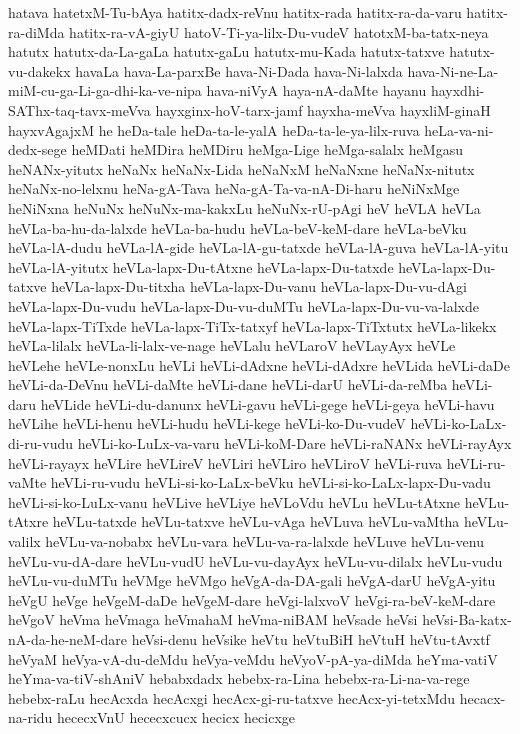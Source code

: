 {hatava
hatetxM-Tu-bAya
hatitx-dadx-reVnu
hatitx-rada
hatitx-ra-da-varu
hatitx-ra-diMda
hatitx-ra-vA-giyU
hatoV-Ti-ya-lilx-Du-vudeV
hatotxM-ba-tatx-neya
hatutx
hatutx-da-La-gaLa
hatutx-gaLu
hatutx-mu-Kada
hatutx-tatxve
hatutx-vu-dakekx
havaLa
hava-La-parxBe
hava-Ni-Dada
hava-Ni-lalxda
hava-Ni-ne-La-miM-cu-ga-Li-ga-dhi-ka-ve-nipa
hava-niVyA
haya-nA-daMte
hayanu
hayxdhi-SAThx-taq-tavx-meVva
hayxginx-hoV-tarx-jamf
hayxha-meVva
hayxliM-ginaH
hayxvAgajxM
he
heDa-tale
heDa-ta-le-yalA
heDa-ta-le-ya-lilx-ruva
heLa-va-ni-dedx-sege
heMDati
heMDira
heMDiru
heMga-Lige
heMga-salalx
heMgasu
heNANx-yitutx
heNaNx
heNaNx-Lida
heNaNxM
heNaNxne
heNaNx-nitutx
heNaNx-no-lelxnu
heNa-gA-Tava
heNa-gA-Ta-va-nA-Di-haru
heNiNxMge
heNiNxna
heNuNx
heNuNx-ma-kakxLu
heNuNx-rU-pAgi
heV
heVLA
heVLa
heVLa-ba-hu-da-lalxde
heVLa-ba-hudu
heVLa-beV-keM-dare
heVLa-beVku
heVLa-lA-dudu
heVLa-lA-gide
heVLa-lA-gu-tatxde
heVLa-lA-guva
heVLa-lA-yitu
heVLa-lA-yitutx
heVLa-lapx-Du-tAtxne
heVLa-lapx-Du-tatxde
heVLa-lapx-Du-tatxve
heVLa-lapx-Du-titxha
heVLa-lapx-Du-vanu
heVLa-lapx-Du-vu-dAgi
heVLa-lapx-Du-vudu
heVLa-lapx-Du-vu-duMTu
heVLa-lapx-Du-vu-va-lalxde
heVLa-lapx-TiTxde
heVLa-lapx-TiTx-tatxyf
heVLa-lapx-TiTxtutx
heVLa-likekx
heVLa-lilalx
heVLa-li-lalx-ve-nage
heVLalu
heVLaroV
heVLayAyx
heVLe
heVLehe
heVLe-nonxLu
heVLi
heVLi-dAdxne
heVLi-dAdxre
heVLida
heVLi-daDe
heVLi-da-DeVnu
heVLi-daMte
heVLi-dane
heVLi-darU
heVLi-da-reMba
heVLi-daru
heVLide
heVLi-du-danunx
heVLi-gavu
heVLi-gege
heVLi-geya
heVLi-havu
heVLihe
heVLi-henu
heVLi-hudu
heVLi-kege
heVLi-ko-Du-vudeV
heVLi-ko-LaLx-di-ru-vudu
heVLi-ko-LuLx-va-varu
heVLi-koM-Dare
heVLi-raNANx
heVLi-rayAyx
heVLi-rayayx
heVLire
heVLireV
heVLiri
heVLiro
heVLiroV
heVLi-ruva
heVLi-ru-vaMte
heVLi-ru-vudu
heVLi-si-ko-LaLx-beVku
heVLi-si-ko-LaLx-lapx-Du-vadu
heVLi-si-ko-LuLx-vanu
heVLive
heVLiye
heVLoVdu
heVLu
heVLu-tAtxne
heVLu-tAtxre
heVLu-tatxde
heVLu-tatxve
heVLu-vAga
heVLuva
heVLu-vaMtha
heVLu-valilx
heVLu-va-nobabx
heVLu-vara
heVLu-va-ra-lalxde
heVLuve
heVLu-venu
heVLu-vu-dA-dare
heVLu-vudU
heVLu-vu-dayAyx
heVLu-vu-dilalx
heVLu-vudu
heVLu-vu-duMTu
heVMge
heVMgo
heVgA-da-DA-gali
heVgA-darU
heVgA-yitu
heVgU
heVge
heVgeM-daDe
heVgeM-dare
heVgi-lalxvoV
heVgi-ra-beV-keM-dare
heVgoV
heVma
heVmaga
heVmahaM
heVma-niBAM
heVsade
heVsi
heVsi-Ba-katx-nA-da-he-neM-dare
heVsi-denu
heVsike
heVtu
heVtuBiH
heVtuH
heVtu-tAvxtf
heVyaM
heVya-vA-du-deMdu
heVya-veMdu
heVyoV-pA-ya-diMda
heYma-vatiV
heYma-va-tiV-shAniV
hebabxdadx
hebebx-ra-Lina
hebebx-ra-Li-na-va-rege
hebebx-raLu
hecAcxda
hecAcxgi
hecAcx-gi-ru-tatxve
hecAcx-yi-tetxMdu
hecacx-na-ridu
hececxVnU
hececxcucx
hecicx
hecicxge
}
